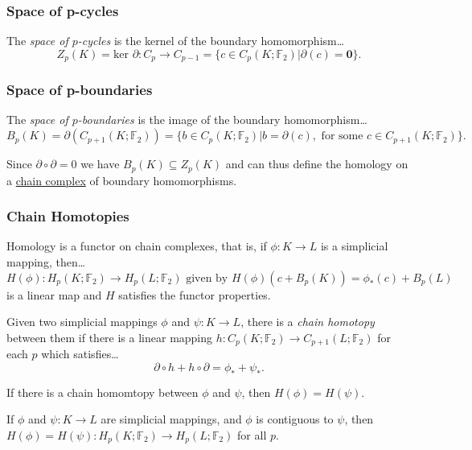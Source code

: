 \subsubsection{Space of p-cycles}\label{pcycles}
The \emph{space of $p$-cycles} is the kernel of the boundary homomorphism\dots
$$Z_p(K) = \textrm{ker }\partial : C_p \rightarrow C_{p-1} = \{ c \in C_p(K; \mathbb{F}_2) | \partial(c) = \textbf{0} \}.$$

\subsubsection{Space of p-boundaries}\label{pboundaries}
The \emph{space of $p$-boundaries} is the image of the boundary homomorphism\dots
$$B_p(K) = \partial(C_{p+1}(K; \mathbb{F}_2)) = \{ b \in C_p(K; \mathbb{F}_2) | b = \partial(c), \textrm{ for some } c \in C_{p+1}(K; \mathbb{F}_2) \}.$$\newline

\noindent Since $\partial \circ \partial = 0$ we have $B_p(K) \subseteq Z_p(K)$ and can thus define the homology on a \hyperref[complexes]{chain
complex} of boundary homomorphisms.

\subsubsection{Chain Homotopies}\label{chainhomotopy}
Homology is a functor on chain complexes, that is, if $\phi : K \rightarrow L$ is a simplicial mapping, then\dots
$$H(\phi) : H_p(K; \mathbb{F}_2) \rightarrow H_p(L; \mathbb{F}_2) \textrm{ given by } H(\phi)(c + B_p(K)) = \phi_*(c) + B_p(L)$$
is a linear map and $H$ satisfies the functor properties.\newline

\noindent Given two simplicial mappings $\phi$ and $\psi : K \rightarrow L$, there is a \emph{chain homotopy} between them if
there is a linear mapping $h : C_p(K; \mathbb{F}_2) \rightarrow C_{p+1}(L; \mathbb{F}_2)$ for each $p$ which satisfies\dots
$$\partial \circ h + h \circ \partial = \phi_* + \psi_*.$$

\begin{theorem}
If there is a chain homomtopy between $\phi$ and $\psi$, then $H(\phi) = H(\psi)$.
\end{theorem}

\begin{corollary}
If $\phi$ and $\psi : K \rightarrow L$ are simplicial mappings, and $\phi$ is contiguous to $\psi$, then
$H(\phi) = H(\psi) : H_p(K; \mathbb{F}_2) \rightarrow H_p(L;\mathbb{F}_2)$ for all $p$.
\end{corollary}

